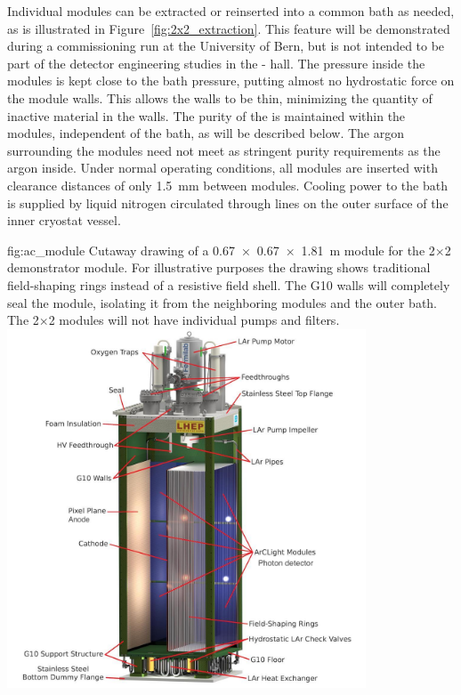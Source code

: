 Individual modules can be extracted or reinserted into a common  bath as needed, as is illustrated in Figure~\ref{fig:2x2_extraction}. This feature will be demonstrated during a commissioning run at the University of Bern, but is not intended to be part of the detector engineering studies in the - hall. The pressure inside the modules is kept close to the bath pressure, putting almost no hydrostatic force on the module walls.  This allows the walls to be thin, minimizing the quantity of inactive material in the walls. The purity of the  is maintained within the modules, independent of the bath, as will be described below. The argon surrounding the modules need not meet as stringent purity requirements as the argon inside. Under normal operating conditions, all modules are inserted with  clearance distances of only \SI{1.5}{\milli\metre} between modules. Cooling power to the bath is supplied by liquid nitrogen circulated through lines on the outer surface of the inner cryostat vessel.


\begin{dunefigure}{fig:ac_module}
{Cutaway drawing of a \SI{0.67 x 0.67 x 1.81}{\metre}  module for the 2$\times$2 demonstrator module. For illustrative purposes the drawing shows traditional field-shaping rings instead of a resistive field shell. The G10 walls will completely seal the module, isolating it from the neighboring modules and the outer  bath. %
The 2$\times$2 modules will not have individual pumps and filters.}
\includegraphics[width=0.8\textwidth]{graphics/Normal-Module-4K_labelled.jpeg}
\end{dunefigure}

